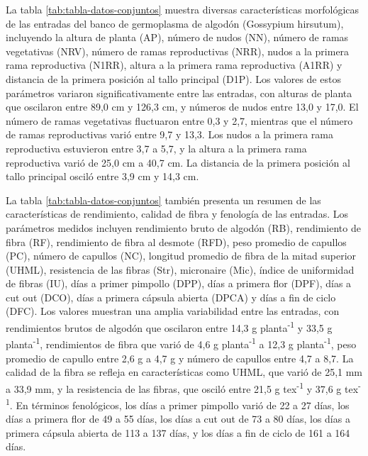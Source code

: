 \documentclass[12pt,oneside]{reedthesis}
\begin{document}
La tabla \ref{tab:tabla-datos-conjuntos} muestra diversas características morfológicas de las entradas del banco de germoplasma de algodón (Gossypium hirsutum), incluyendo la altura de planta (AP), número de nudos (NN), número de ramas vegetativas (NRV), número de ramas reproductivas (NRR), nudos a la primera rama reproductiva (N1RR), altura a la primera rama reproductiva (A1RR) y distancia de la primera posición al tallo principal (D1P). Los valores de estos parámetros variaron significativamente entre las entradas, con alturas de planta que oscilaron entre 89,0 cm y 126,3 cm, y números de nudos entre 13,0 y 17,0. El número de ramas vegetativas fluctuaron entre 0,3 y 2,7, mientras que el número de ramas reproductivas varió entre 9,7 y 13,3. Los nudos a la primera rama reproductiva estuvieron entre 3,7 a 5,7, y la altura a la primera rama reproductiva varió de 25,0 cm a 40,7 cm. La distancia de la primera posición al tallo principal osciló entre 3,9 cm y 14,3 cm.

La tabla \ref{tab:tabla-datos-conjuntos} también presenta un resumen de las características de rendimiento, calidad de fibra y fenología de las entradas. Los parámetros medidos incluyen rendimiento bruto de algodón (RB), rendimiento de fibra (RF), rendimiento de fibra al desmote (RFD), peso promedio de capullos (PC), número de capullos (NC), longitud promedio de fibra de la mitad superior (UHML), resistencia de las fibras (Str), micronaire (Mic), índice de uniformidad de fibras (IU), días a primer pimpollo (DPP), días a primera flor (DPF), días a cut out (DCO), días a primera cápsula abierta (DPCA) y días a fin de ciclo (DFC). Los valores muestran una amplia variabilidad entre las entradas, con rendimientos brutos de algodón que oscilaron entre 14,3 g planta\textsuperscript{-1} y 33,5 g planta\textsuperscript{-1}, rendimientos de fibra que varió de 4,6 g planta\textsuperscript{-1} a 12,3 g planta\textsuperscript{-1}, peso promedio de capullo entre 2,6 g a 4,7 g y número de capullos entre 4,7 a 8,7. La calidad de la fibra se refleja en características como UHML, que varió de 25,1 mm a 33,9 mm, y la resistencia de las fibras, que osciló entre 21,5 g tex\textsuperscript{-1} y 37,6 g tex\textsuperscript{-1}. En términos fenológicos, los días a primer pimpollo varió de 22 a 27 días, los días a primera flor de 49 a 55 días, los días a cut out de 73 a 80 días, los días a primera cápsula abierta de 113 a 137 días, y los días a fin de ciclo de 161 a 164 días.
\end{document}
